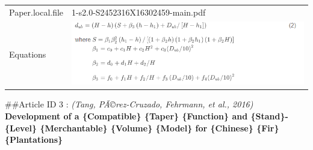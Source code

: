 \documentclass[]{article}
\begin{document}
\begin{longtable}[]{@{}ll@{}}
\begin{minipage}[t]{0.21\columnwidth}
Paper.local.file\strut
\end{minipage} & \begin{minipage}[t]{0.73\columnwidth}\raggedright
1-s2.0-S2452316X16302459-main.pdf\strut
\end{minipage}\tabularnewline
\begin{minipage}[t]{0.21\columnwidth}\raggedright
Equations\strut
\end{minipage} & \begin{minipage}[t]{0.73\columnwidth}\raggedright
\includegraphics{Equations/2016WarnerEtAl.png}\strut
\end{minipage}\tabularnewline
\bottomrule
\end{longtable}

\#\#Article ID 3 : \emph{(Tang, PÃ©rez-Cruzado, Fehrmann, et al., 2016)}
\textbf{Development of a \{Compatible\} \{Taper\} \{Function\} and
\{Stand\}-\{Level\} \{Merchantable\} \{Volume\} \{Model\} for
\{Chinese\} \{Fir\} \{Plantations\}}
\end{document}
